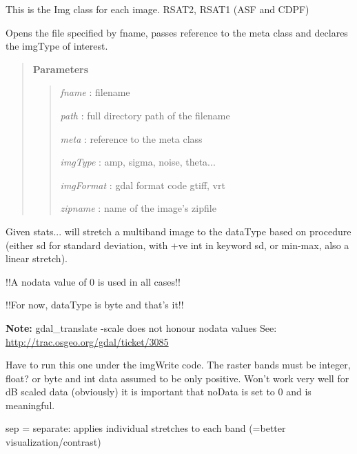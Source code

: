 \documentclass[letterpaper,10pt,openany,oneside]{sphinxmanual}
\begin{document}
\begin{fulllineitems}
\label{code:Image.Image}
This is the Img class for each image.  RSAT2, RSAT1 (ASF and CDPF)

Opens the file specified by fname, passes reference to the meta class and declares the imgType of interest.
\begin{quote}

\textbf{Parameters}
\begin{quote}

\emph{fname}     : filename

\emph{path}      : full directory path of the filename

\emph{meta}      : reference to the meta class

\emph{imgType}   : amp, sigma, noise, theta...

\emph{imgFormat} : gdal format code gtiff, vrt

\emph{zipname}   : name of the image's zipfile
\end{quote}
\end{quote}

\begin{fulllineitems}
\label{code:Image.Image.applyStretch}
Given stats... will stretch a multiband image to the dataType based on
procedure (either sd for standard deviation, with +ve int in keyword sd,
or min-max, also a linear stretch).

!!A nodata value of 0 is used in all cases!!

!!For now, dataType is byte and that's it!!

\textbf{Note:} gdal\_translate -scale does not honour nodata values
See: \href{http://trac.osgeo.org/gdal/ticket/3085}{http://trac.osgeo.org/gdal/ticket/3085}

Have to run this one under the imgWrite code. The raster bands must be integer, float? or byte
and int data assumed to be only positive. Won't work very well for dB scaled data (obviously)
it is important that noData is set to 0 and is meaningful.

sep = separate: applies individual stretches to each band (=better visualization/contrast)


\end{fulllineitems}
\end{fulllineitems}
\end{document}
